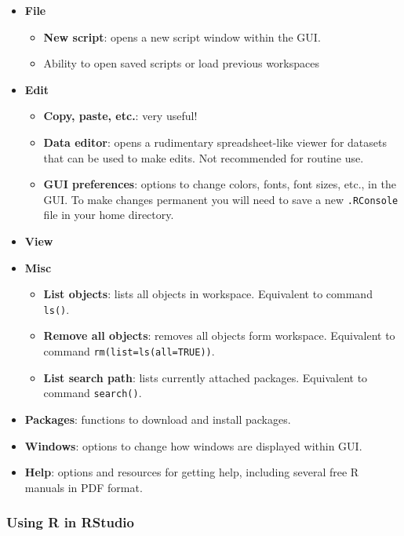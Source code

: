 \documentclass[
  13,
  letterpaper,
]{report}
\providecommand{\tightlist}{%
  \setlength{\itemsep}{0pt}\setlength{\parskip}{0pt}}
\begin{document}
\begin{itemize}
\tightlist
\item
  \textbf{File}

  \begin{itemize}
  \tightlist
  \item
    \textbf{New script}: opens a new script window within the GUI.
  \item
    Ability to open saved scripts or load previous workspaces
  \end{itemize}
\item
  \textbf{Edit}

  \begin{itemize}
  \tightlist
  \item
    \textbf{Copy, paste, etc.}: very useful!
  \item
    \textbf{Data editor}: opens a rudimentary spreadsheet-like viewer
    for datasets that can be used to make edits. Not recommended for
    routine use.
  \item
    \textbf{GUI preferences}: options to change colors, fonts, font
    sizes, etc., in the GUI. To make changes permanent you will need to
    save a new \texttt{.RConsole} file in your home directory.
  \end{itemize}
\item
  \textbf{View}
\item
  \textbf{Misc}

  \begin{itemize}
  \tightlist
  \item
    \textbf{List objects}: lists all objects in workspace. Equivalent to
    command \texttt{ls()}.
  \item
    \textbf{Remove all objects}: removes all objects form workspace.
    Equivalent to command \texttt{rm(list=ls(all=TRUE))}.
  \item
    \textbf{List search path}: lists currently attached packages.
    Equivalent to command \texttt{search()}.
  \end{itemize}
\item
  \textbf{Packages}: functions to download and install packages.
\item
  \textbf{Windows}: options to change how windows are displayed within
  GUI.
\item
  \textbf{Help}: options and resources for getting help, including
  several free R manuals in PDF format.
\end{itemize}

\subsubsection{Using R in RStudio}\label{using-r-in-rstudio}
\end{document}
